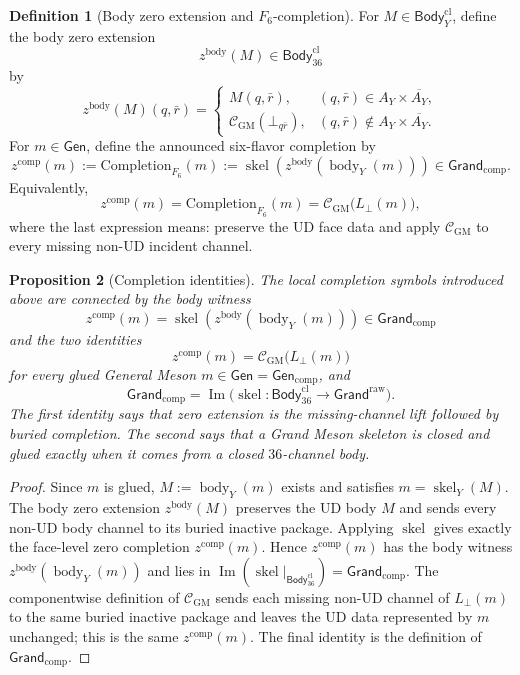 \documentclass[11pt]{article}
\theoremstyle{definition}
\newtheorem{definition}{Definition}
\theoremstyle{plain}
\newtheorem{proposition}[definition]{Proposition}
\DeclareMathOperator{\skel}{skel}
\DeclareMathOperator{\body}{body}
\begin{document}
\begin{definition}[Body zero extension and \(F_6\)-completion]
For \(M\in\mathsf{Body}_{Y}^{\mathrm{cl}}\), define the body zero extension
\[
  z^{\mathrm{body}}(M)\in\mathsf{Body}_{36}^{\mathrm{cl}}
\]
by
\[
  z^{\mathrm{body}}(M)(q,\bar r)
  =
  \begin{cases}
    M(q,\bar r), & (q,\bar r)\in A_Y\times\overline{A_Y},\\
    \mathcal C_{\mathrm{GM}}(\bot_{q\bar r}),
      & (q,\bar r)\notin A_Y\times\overline{A_Y}.
  \end{cases}
\]
For \(m\in\mathsf{Gen}\), define the announced six-flavor completion by
\[
  z^{\mathrm{comp}}(m)
  :=
  \mathrm{Completion}_{F_6}(m)
  :=
  \skel\!\left(z^{\mathrm{body}}(\body_Y(m))\right)
  \in\mathsf{Grand}_{\mathrm{comp}}.
\]
Equivalently,
\[
  z^{\mathrm{comp}}(m)
  =
  \mathrm{Completion}_{F_6}(m)
  =
  \mathcal C_{\mathrm{GM}}\bigl(L_{\bot}(m)\bigr),
\]
where the last expression means: preserve the UD face data and apply
\(\mathcal C_{\mathrm{GM}}\) to every missing non-UD incident channel.
\end{definition}

\begin{proposition}[Completion identities]
The local completion symbols introduced above are connected by the body
witness
\[
  \boxed{
  z^{\mathrm{comp}}(m)=\skel\!\left(z^{\mathrm{body}}(\body_Y(m))\right)
  \in\mathsf{Grand}_{\mathrm{comp}}
  }
\]
and the two identities
\[
  \boxed{
  z^{\mathrm{comp}}(m)=\mathcal C_{\mathrm{GM}}\bigl(L_{\bot}(m)\bigr)
  }
\]
for every glued General Meson
\(m\in\mathsf{Gen}=\mathsf{Gen}_{\mathrm{comp}}\), and
\[
  \boxed{
  \mathsf{Grand}_{\mathrm{comp}}
  =
  \operatorname{Im}
  \bigl(
    \skel:\mathsf{Body}_{36}^{\mathrm{cl}}\to\mathsf{Grand}^{\mathrm{raw}}
  \bigr).
  }
\]
The first identity says that zero extension is the missing-channel lift
followed by buried completion.  The second says that a Grand Meson skeleton
is closed and glued exactly when it comes from a closed \(36\)-channel body.
\end{proposition}

\begin{proof}
Since \(m\) is glued, \(M:=\body_Y(m)\) exists and satisfies
\(m=\skel_Y(M)\).  The body zero extension \(z^{\mathrm{body}}(M)\)
preserves the UD body \(M\) and sends every non-UD body channel to its buried
inactive package.  Applying \(\skel\) gives exactly the face-level zero
completion \(z^{\mathrm{comp}}(m)\).  Hence \(z^{\mathrm{comp}}(m)\) has the body witness
\(z^{\mathrm{body}}(\body_Y(m))\) and lies in
\(\operatorname{Im}(\skel|_{\mathsf{Body}_{36}^{\mathrm{cl}}})
=\mathsf{Grand}_{\mathrm{comp}}\).
The componentwise definition of \(\mathcal C_{\mathrm{GM}}\) sends each
missing non-UD channel of \(L_{\bot}(m)\) to the same buried inactive
package and leaves the UD data represented by \(m\) unchanged; this is the
same \(z^{\mathrm{comp}}(m)\).  The final identity is the definition of
\(\mathsf{Grand}_{\mathrm{comp}}\).
\end{proof}
\end{document}
